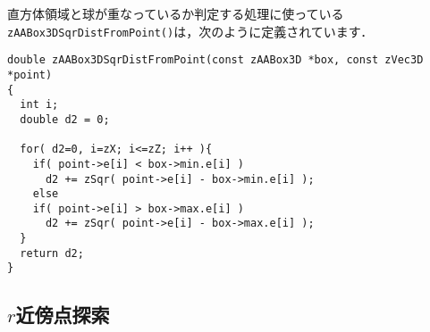 ﻿\documentclass[a4paper]{jsarticle}
\begin{document}
直方体領域と球が重なっているか判定する処理に使っている\verb|zAABox3DSqrDistFromPoint()|は，次のように定義されています．
\begin{screen}
\begin{verbatim}
double zAABox3DSqrDistFromPoint(const zAABox3D *box, const zVec3D *point)
{
  int i;
  double d2 = 0;

  for( d2=0, i=zX; i<=zZ; i++ ){
    if( point->e[i] < box->min.e[i] )
      d2 += zSqr( point->e[i] - box->min.e[i] );
    else
    if( point->e[i] > box->max.e[i] )
      d2 += zSqr( point->e[i] - box->max.e[i] );
  }
  return d2;
}
\end{verbatim}
\end{screen}


\subsection{$r$近傍点探索}
\end{document}
